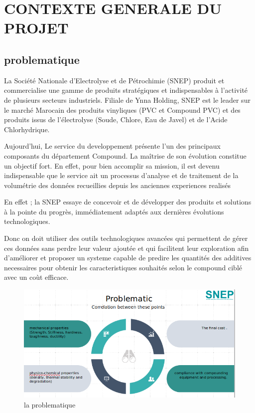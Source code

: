 \documentclass[11pt]{report}
\begin{document}
\chapter{CONTEXTE GENERALE DU PROJET}
\section*{problematique}
La Société Nationale d'Electrolyse et de Pétrochimie (SNEP) produit et commercialise une gamme de produits stratégiques et indispensables à l’activité de plusieurs secteurs industriels. Filiale de Ynna Holding, SNEP est le leader sur le marché Marocain des produits vinyliques (PVC et Compound PVC) et des produits issus de l'électrolyse (Soude, Chlore, Eau de Javel) et de l'Acide Chlorhydrique. 

Aujourd'hui, Le service du developpement présente l’un des principaux composants du département Compound. La maîtrise de son évolution constitue un objectif fort. En effet, pour bien accomplir sa mission, il est devenu indispensable que le service ait un processus d’analyse et de
traitement de la volumétrie des données recueillies depuis les anciennes experiences realisés

En effet ; la SNEP essaye de concevoir et de développer des produits et solutions
à la pointe du progrès, immédiatement adaptés aux dernières évolutions technologiques.


Donc on doit utiliser des outils technologiques avancées qui permettent de gérer ces données sans perdre leur valeur ajoutée et qui facilitent leur exploration afin d’améliorer et proposer un systeme capable de predire les quantités des additives necessaires pour obtenir les caracteristiques souhaités selon le compound ciblé avec un coùt efficace.
\begin{figure}[H]
	\begin{center}
		\includegraphics[width=12cm]{images/prob.png}
		\caption{la problematique}
		\label{fig:figure}
	\end{center}
\end{figure}
\end{document}
